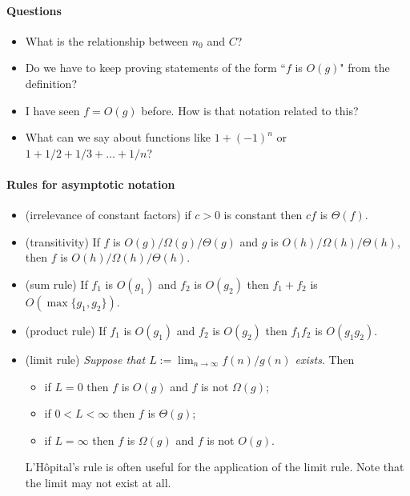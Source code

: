 \paragraph{Questions}
\begin{itemize}
\item What is the relationship between $n_0$ and $C$?
\item Do we have to keep proving statements of the form ``$f$ is $O(g)$" from the definition?
\item I have seen $f = O(g)$ before. How is that notation related to this?
\item What can we say about functions like $1+(-1)^n$ or $1+1/2+1/3+\dots + 1/n$?
\end{itemize}


\paragraph{Rules for asymptotic notation}
\begin{itemize}
\item (irrelevance of constant factors) if $c > 0$ is constant then $cf$ is $\Theta(f)$.
\item (transitivity) If $f$ is $O(g)/\Omega(g)/\Theta(g)$ and $g$ is 
$O(h)/\Omega(h)/\Theta(h)$, then $f$ is $O(h)/\Omega(h)/\Theta(h)$.
\item (sum rule) If $f_1$ is $O(g_1)$ and $f_2$ is $O(g_2)$ then $f_1 + f_2$ is 
$O(\max\{g_1, g_2\})$.
\item (product rule) If $f_1$ is $O(g_1)$ and $f_2$ is $O(g_2)$ then $f_1 f_2$ 
is $O(g_1 g_2)$.
\item (limit rule) \emph{Suppose that $L:=\lim_{n\to\infty} f(n)/g(n)$ exists}. 
Then
\begin{itemize}
\item if $L = 0$ then $f$ is $O(g)$ and $f$ is not $\Omega(g)$;
\item if $0 < L < \infty$ then $f$ is $\Theta(g)$;
\item if $L = \infty$ then $f$ is $\Omega(g)$ and $f$ is not $O(g)$.
\end{itemize}
\pause
L'H\^{o}pital's rule is often useful for the application of the limit rule. Note that the 
limit may not exist at all.
\end{itemize}


